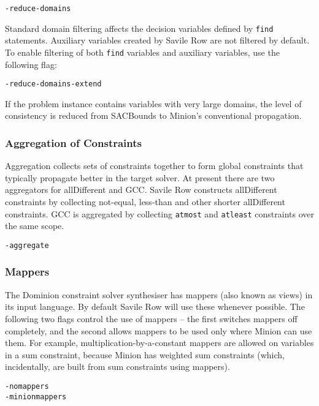 \documentclass[a4paper]{article}
\newcommand{\savilerow}{{\sc Savile Row}\xspace}
\begin{document}
\begin{verbatim}
-reduce-domains
\end{verbatim}

Standard domain filtering affects the decision variables defined by \texttt{find} statements.
Auxiliary variables created by \savilerow are not filtered by default. To enable 
filtering of both \texttt{find} variables and auxiliary variables, use the following flag:

\begin{verbatim}
-reduce-domains-extend
\end{verbatim}

If the problem instance contains variables with very large domains, the level of
consistency is reduced from SACBounds to Minion's conventional propagation.  

\subsubsection*{Aggregation of Constraints}

Aggregation collects sets of constraints together to form global constraints
that typically propagate better in the target solver. At present there are two
aggregators for allDifferent and GCC. \savilerow
constructs allDifferent constraints by collecting not-equal, less-than and 
other shorter allDifferent constraints. GCC is aggregated by collecting \texttt{atmost} and
\texttt{atleast} constraints over the same scope. 

\begin{verbatim}
-aggregate
\end{verbatim}

\subsubsection*{Mappers}

The Dominion constraint solver synthesiser has mappers (also known as views) in 
its input language. By default \savilerow will use these whenever possible. The
following two flags control the use of mappers -- the first switches mappers off 
completely, and the second allows mappers to be used only where Minion can use them.
For example, multiplication-by-a-constant mappers are allowed on variables in a sum constraint,
because Minion has weighted sum constraints (which, incidentally, are built from  
sum constraints using mappers). 

\begin{verbatim}
-nomappers
-minionmappers
\end{verbatim}
\end{document}
